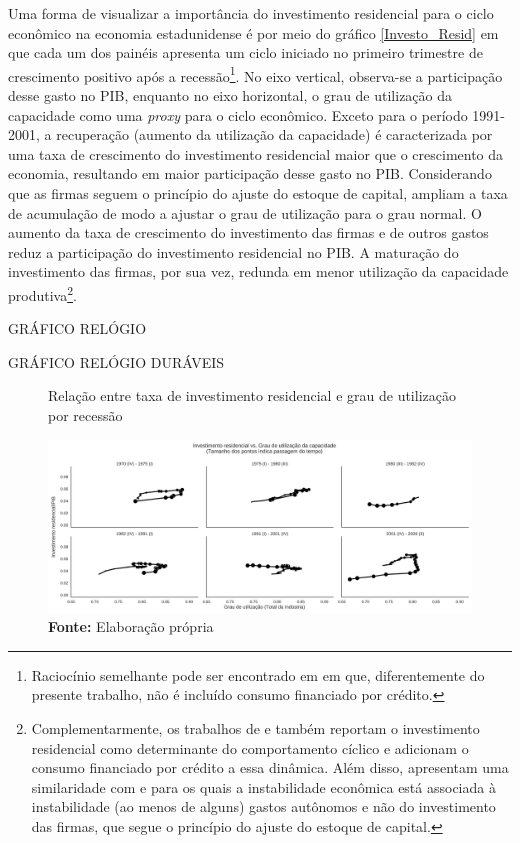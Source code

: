 Uma forma de visualizar a importância do investimento residencial para o ciclo econômico na economia estadunidense é por meio do gráfico \ref{Investo_Resid} em que cada um dos painéis apresenta um ciclo iniciado no primeiro trimestre de crescimento positivo após a recessão\footnote{
	Raciocínio semelhante pode ser encontrado em \textcite{fiebiger_semi-autonomous_2018} em que, diferentemente do presente trabalho, não é incluído consumo financiado por crédito.}. 
No eixo vertical, observa-se a participação desse gasto no PIB, enquanto no eixo horizontal, o grau de utilização da capacidade como uma \textit{proxy} para o ciclo econômico. Exceto para o período 1991-2001, a recuperação (aumento da utilização da capacidade) é caracterizada por uma taxa de crescimento do investimento residencial maior que o crescimento da economia, resultando em maior participação desse gasto no PIB. Considerando que as firmas seguem o princípio do ajuste do estoque de capital, ampliam a taxa de acumulação de modo a ajustar o grau de utilização para o grau normal. O aumento da taxa de crescimento do investimento das firmas e de outros gastos reduz a participação do investimento residencial no PIB. A maturação do investimento das firmas, por sua vez, redunda em menor utilização da capacidade produtiva\footnote{
	Complementarmente, os trabalhos de \textcite{fiebiger_semi-autonomous_2018} e \textcite{fiebiger_trend_2017} também reportam o investimento residencial como determinante do comportamento cíclico e adicionam o consumo financiado por crédito a essa dinâmica. Além disso, apresentam uma similaridade com \textcite{dejuan_hidden_2017} e \textcite{teixeira_crescimento_2015} para os quais a instabilidade econômica está associada à instabilidade (ao menos de alguns) gastos autônomos e não do investimento das firmas, que segue o princípio do ajuste do estoque de capital.}. 


GRÁFICO RELÓGIO

GRÁFICO RELÓGIO DURÁVEIS

\begin{figure}[htb]
	\centering
	\caption{Relação entre taxa de investimento residencial e grau de utilização por recessão}
	\label{FigIh_u}
	\includegraphics[width=\textwidth]{../../Dados/Fatos_Estilizados/figs/Ciclo_Ih_u.png}
	\caption*{\textbf{Fonte:} Elaboração própria}
\end{figure}


